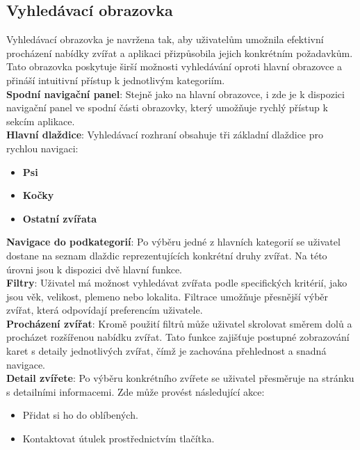 \documentclass[12pt,a4paper]{report}
\begin{document}
\subsection{Vyhledávací obrazovka}

Vyhledávací obrazovka je navržena tak, aby uživatelům umožnila efektivní procházení nabídky zvířat a aplikaci přizpůsobila jejich konkrétním požadavkům. Tato obrazovka poskytuje širší možnosti vyhledávání oproti hlavní obrazovce a přináší intuitivní přístup k jednotlivým kategoriím.\\

\noindent \textbf{Spodní navigační panel}: Stejně jako na hlavní obrazovce, i zde je k dispozici navigační panel ve spodní části obrazovky, který umožňuje rychlý přístup k sekcím aplikace.\\

\noindent \textbf{Hlavní dlaždice}: Vyhledávací rozhraní obsahuje tři základní dlaždice pro rychlou navigaci:
\begin{itemize}
    \item \textbf{Psi}
    \item \textbf{Kočky}
    \item \textbf{Ostatní zvířata}
\end{itemize}
\noindent \textbf{Navigace do podkategorií}: Po výběru jedné z hlavních kategorií se uživatel dostane na seznam dlaždic reprezentujících konkrétní druhy zvířat. Na této úrovni jsou k dispozici dvě hlavní funkce.\\

\noindent \textbf{Filtry}: Uživatel má možnost vyhledávat zvířata podle specifických kritérií, jako jsou věk, velikost, plemeno nebo lokalita. Filtrace umožňuje přesnější výběr zvířat, která odpovídají preferencím uživatele.\\

\noindent \textbf{Procházení zvířat}: Kromě použití filtrů může uživatel skrolovat směrem dolů a procházet rozšířenou nabídku zvířat. Tato funkce zajišťuje postupné zobrazování karet s detaily jednotlivých zvířat, čímž je zachována přehlednost a snadná navigace.\\

\noindent \textbf{Detail zvířete}: Po výběru konkrétního zvířete se uživatel přesměruje na stránku s detailními informacemi. Zde může provést následující akce:
\begin{itemize}
    \item Přidat si ho do oblíbených.
    \item Kontaktovat útulek prostřednictvím tlačítka.
\end{itemize}
\end{document}
